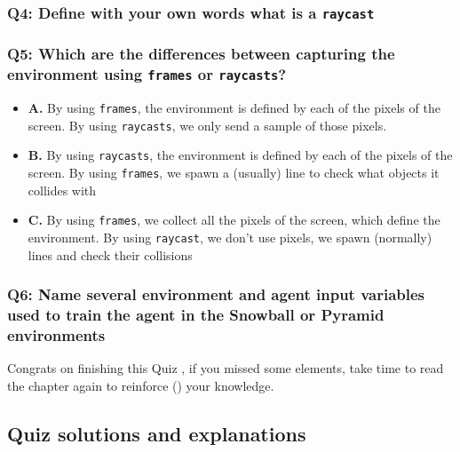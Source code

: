 \documentclass[11pt,a4paper]{article}
\begin{document}
\subsubsection{\texorpdfstring{Q4: Define with your own words what is a \texttt{raycast}}{Q4: Define with your own words what is a raycast}}\label{q4-define-with-your-own-words-what-is-a-raycast}

\subsubsection{\texorpdfstring{Q5: Which are the differences between capturing the environment using \texttt{frames} or \texttt{raycasts}?}{Q5: Which are the differences between capturing the environment using frames or raycasts?}}\label{q5-which-are-the-differences-between-capturing-the-environment-using-frames-or-raycasts}

\begin{itemize}
\tightlist
\item
  \textbf{A.} By using \texttt{frames}, the environment is defined by each of the pixels of the screen. By using \texttt{raycasts}, we only send a sample of those pixels.
\item
  \textbf{B.} By using \texttt{raycasts}, the environment is defined by each of the pixels of the screen. By using \texttt{frames}, we spawn a (usually) line to check what objects it collides with
\item
  \textbf{C.} By using \texttt{frames}, we collect all the pixels of the screen, which define the environment. By using \texttt{raycast}, we don't use pixels, we spawn (normally) lines and check their collisions
\end{itemize}

\subsubsection{Q6: Name several environment and agent input variables used to train the agent in the Snowball or Pyramid environments}\label{q6-name-several-environment-and-agent-input-variables-used-to-train-the-agent-in-the-snowball-or-pyramid-environments}

Congrats on finishing this Quiz , if you missed some elements, take time to read the chapter again to reinforce () your knowledge.

\subsection{Quiz solutions and explanations}\label{quiz-solutions-and-explanations}
\end{document}
